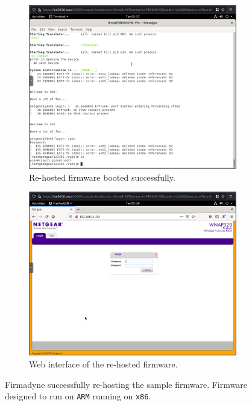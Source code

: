 \begin{figure}[H]
     \centering
     \begin{subfigure}[b]{0.45\textwidth}
         \centering
         \includegraphics[width=\textwidth]{figs/sucess.png}
         \caption{Re-hosted firmware booted successfully.}
         \label{fig:qemu-sucess1}
     \end{subfigure}
     \hfill
     \begin{subfigure}[b]{0.45\textwidth}
         \centering
         \includegraphics[width=\textwidth]{figs/sucess2.png}
         \caption{Web interface of the re-hosted firmware.}
         \label{fig:qemu-sucess2}
     \end{subfigure}
        \caption{Firmadyne successfully re-hosting the sample firmware. Firmware designed to run on {\tt ARM} running on {\tt x86}.}
        \label{fig:emulated-sucess}
\end{figure}

